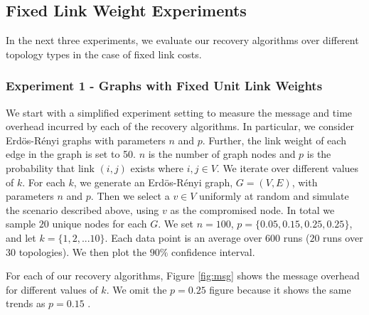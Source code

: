 \subsection{Fixed Link Weight Experiments}
\label{subsec:fixed}

In the next three experiments, we evaluate our recovery algorithms over different topology types in the case of fixed link costs.

\subsubsection{Experiment 1 - \er Graphs with Fixed Unit Link Weights}
\label{subsubsec:expt1}

We start with a simplified experiment setting to measure the 
 message and time overhead incurred by each of the recovery
 algorithms. In particular, we consider 
Erd\"{o}s-R\'enyi graphs with parameters $n$ and $p$. Further, the
link weight of each edge in the graph is set to 50.
$n$ is the number of graph nodes and $p$ is the probability that link $(i,j)$ exists where $i,j \in V$. We iterate over different values of $k$. For each $k$, we 
generate an Erd\"{o}s-R\'enyi graph, $G = (V,E)$, with parameters $n$ and $p$. Then we select a $v \in V$ uniformly at random and simulate the scenario described above, 
using $v$ as the compromised node. In total we sample $20$ unique nodes for each $G$.
We set $n=100$, $p=\{0.05,0.15,0.25, 0.25\}$, and let $k=\{1,2,
... 10\}$. Each data point is an average over $600$ runs ($20$ runs over 
$30$ topologies).  We then plot the $90 \%$ confidence interval.

For each of our recovery algorithms, Figure \ref{fig:msg} shows the
message overhead for different values of $k$. %
We omit the $p=0.25$ figure because it shows the same trends as $p=0.15$ \cite{Tech}. 

\begin{figure*}[t]
\centering
{}
\caption{Message overhead for \er Graphs with Fixed Unit Link Weights generated over different $p$ values.}
\label{fig:msg}
\end{figure*}

